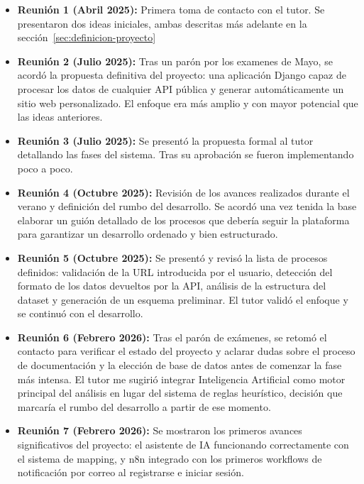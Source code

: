 \begin{itemize}
	\item \textbf{Reunión 1 (Abril 2025):} Primera toma de contacto con el tutor. Se presentaron dos ideas iniciales, ambas descritas más adelante en la sección~\ref{sec:definicion-proyecto}

	\item \textbf{Reunión 2 (Julio 2025):} Tras un parón por los examenes de Mayo, se acordó la propuesta definitiva del proyecto: una aplicación Django capaz de procesar los datos de cualquier API pública y generar automáticamente un sitio web personalizado. El enfoque era más amplio y con mayor potencial que las ideas anteriores.

	\item \textbf{Reunión 3 (Julio 2025):} Se presentó la propuesta formal al tutor detallando las fases del sistema. Tras su aprobación se fueron implementando poco a poco.

	\item \textbf{Reunión 4 (Octubre 2025):} Revisión de los avances realizados durante el verano y definición del rumbo del desarrollo. Se acordó una vez tenida la base elaborar un guión detallado de los procesos que debería seguir la plataforma para garantizar un desarrollo ordenado y bien estructurado.

	\item \textbf{Reunión 5 (Octubre 2025):} Se presentó y revisó la lista de procesos definidos: validación de la URL introducida por el usuario, detección del formato de los datos devueltos por la API, análisis de la estructura del dataset y generación de un esquema preliminar. El tutor validó el enfoque y se continuó con el desarrollo.

	\item \textbf{Reunión 6 (Febrero 2026):} Tras el parón de exámenes, se retomó el contacto para verificar el estado del proyecto y aclarar dudas sobre el proceso de documentación y la elección de base de datos antes de comenzar la fase más intensa. El tutor me sugirió integrar Inteligencia Artificial como motor principal del análisis en lugar del sistema de reglas heurístico, decisión que marcaría el rumbo del desarrollo a partir de ese momento.
	
	\item \textbf{Reunión 7 (Febrero 2026):} Se mostraron los primeros avances significativos del proyecto: el asistente de IA funcionando correctamente con el sistema de mapping, y n8n integrado con los primeros workflows de notificación por correo al registrarse e iniciar sesión.


\end{itemize}

